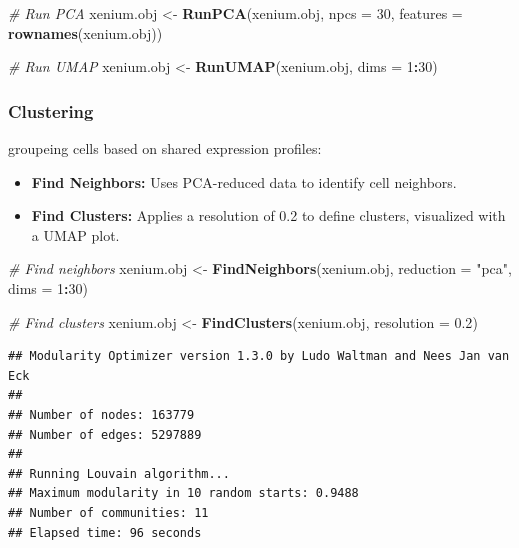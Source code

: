 \documentclass[
]{article}
\newenvironment{Shaded}{\begin{snugshade}}{\end{snugshade}}
\newcommand{\AttributeTok}[1]{\textcolor[rgb]{0.13,0.29,0.53}{#1}}
\newcommand{\CommentTok}[1]{\textcolor[rgb]{0.56,0.35,0.01}{\textit{#1}}}
\newcommand{\DecValTok}[1]{\textcolor[rgb]{0.00,0.00,0.81}{#1}}
\newcommand{\FloatTok}[1]{\textcolor[rgb]{0.00,0.00,0.81}{#1}}
\newcommand{\FunctionTok}[1]{\textcolor[rgb]{0.13,0.29,0.53}{\textbf{#1}}}
\newcommand{\NormalTok}[1]{#1}
\newcommand{\OtherTok}[1]{\textcolor[rgb]{0.56,0.35,0.01}{#1}}
\newcommand{\SpecialCharTok}[1]{\textcolor[rgb]{0.81,0.36,0.00}{\textbf{#1}}}
\newcommand{\StringTok}[1]{\textcolor[rgb]{0.31,0.60,0.02}{#1}}
\providecommand{\tightlist}{%
  \setlength{\itemsep}{0pt}\setlength{\parskip}{0pt}}
\begin{document}
\begin{Shaded}
\begin{Highlighting}[]
\CommentTok{\# Run PCA}
\NormalTok{xenium.obj }\OtherTok{\textless{}{-}} \FunctionTok{RunPCA}\NormalTok{(xenium.obj, }\AttributeTok{npcs =} \DecValTok{30}\NormalTok{, }\AttributeTok{features =} \FunctionTok{rownames}\NormalTok{(xenium.obj))}

\CommentTok{\# Run UMAP}
\NormalTok{xenium.obj }\OtherTok{\textless{}{-}} \FunctionTok{RunUMAP}\NormalTok{(xenium.obj, }\AttributeTok{dims =} \DecValTok{1}\SpecialCharTok{:}\DecValTok{30}\NormalTok{)}
\end{Highlighting}
\end{Shaded}

\subsubsection{Clustering}\label{clustering}

groupeing cells based on shared expression profiles:

\begin{itemize}
\tightlist
\item
  \textbf{Find Neighbors:} Uses PCA-reduced data to identify cell
  neighbors.
\item
  \textbf{Find Clusters:} Applies a resolution of 0.2 to define
  clusters, visualized with a UMAP plot.
\end{itemize}

\begin{Shaded}
\begin{Highlighting}[]
\CommentTok{\# Find neighbors}
\NormalTok{xenium.obj }\OtherTok{\textless{}{-}} \FunctionTok{FindNeighbors}\NormalTok{(xenium.obj, }\AttributeTok{reduction =} \StringTok{"pca"}\NormalTok{, }\AttributeTok{dims =} \DecValTok{1}\SpecialCharTok{:}\DecValTok{30}\NormalTok{)}

\CommentTok{\# Find clusters}
\NormalTok{xenium.obj }\OtherTok{\textless{}{-}} \FunctionTok{FindClusters}\NormalTok{(xenium.obj, }\AttributeTok{resolution =} \FloatTok{0.2}\NormalTok{)}
\end{Highlighting}
\end{Shaded}

\begin{verbatim}
## Modularity Optimizer version 1.3.0 by Ludo Waltman and Nees Jan van Eck
## 
## Number of nodes: 163779
## Number of edges: 5297889
## 
## Running Louvain algorithm...
## Maximum modularity in 10 random starts: 0.9488
## Number of communities: 11
## Elapsed time: 96 seconds
\end{verbatim}
\end{document}
